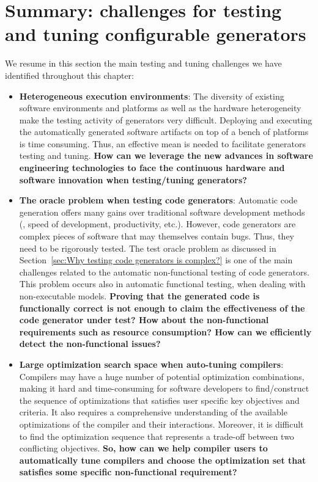 \section{Summary: challenges for testing and tuning configurable generators}
\label{bg:Summary: Testing and optimization challenges}
We resume in this section the main testing and tuning challenges we have identified throughout this chapter:
\begin{itemize}
	\item \textbf{Heterogeneous execution environments}: 
	The diversity of existing software environments and platforms as well as the hardware heterogeneity make the testing activity of generators very difficult. Deploying and executing the automatically generated software artifacts on top of a bench of platforms is time consuming. Thus, an effective mean is needed to facilitate generators testing and tuning.
	\textbf{How can we leverage the new advances in software engineering technologies to face the continuous hardware and software innovation when testing/tuning generators?} 
	
    \item \textbf{The oracle problem when testing code generators}: 	
	Automatic code generation offers many gains over traditional software development methods (\eg, speed of development, productivity, etc.). However, code generators are complex pieces of software that may themselves contain bugs. Thus, they need to be rigorously tested. The test oracle problem as discussed in Section~\ref{sec:Why testing code generators is complex?} is one of the main challenges related to the automatic non-functional testing of code generators. This problem occurs also in automatic functional testing, when dealing with non-executable models.
	\textbf{
	Proving that the generated code is functionally correct is not enough to claim the effectiveness of the code generator under test? How about the non-functional requirements such as resource consumption?
	How can we efficiently detect the non-functional issues?}
	
	\item \textbf{Large optimization search space when auto-tuning compilers}: 
	Compilers may have a huge number of potential optimization combinations, making it hard and time-consuming for software developers to find/construct the sequence of optimizations that satisfies user specific key objectives and criteria. It also requires a comprehensive understanding of the available optimizations of the compiler and their interactions. Moreover, it is difficult to find the optimization sequence that represents a trade-off between two conflicting objectives.  
	\textbf{So, how can we help compiler users to automatically tune compilers and choose the optimization set that satisfies some specific non-functional requirement? }
	

\end{itemize}
